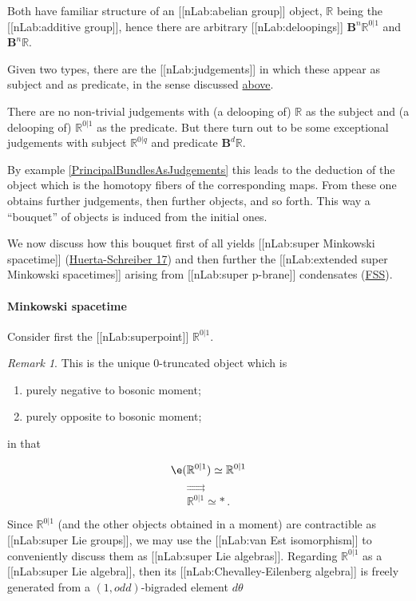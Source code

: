 \documentclass[12pt,titlepage]{article}
\theoremstyle{plain}
\theoremstyle{definition}
\theoremstyle{remark}
\newtheorem{remark}{Remark}
\begin{document}
Both have familiar structure of an [[nLab:abelian group]] object, $\mathbb{R}$ being the [[nLab:additive group]], hence there are arbitrary [[nLab:deloopings]] $\mathbf{B}^n \mathbb{R}^{0|1}$ and $\mathbf{B}^{n}\mathbb{R}$.

Given two types, there are the [[nLab:judgements]] in which these appear as subject and as predicate, in the sense discussed \hyperlink{JudgementInFormalization}{above}.

There are no non-trivial judgements with (a delooping of) $\mathbb{R}$ as the subject and (a delooping of) $\mathbb{R}^{0|1}$ as the predicate. But there turn out to be some exceptional judgements with subject $\mathbb{R}^{0|q}$ and predicate $\mathbf{B}^d \mathbb{R}$.

By example \ref{PrincipalBundlesAsJudgements} this leads to the deduction of the object which is the homotopy fibers of the corresponding maps. From these one obtains further judgements, then further objects, and so forth. This way a ``bouquet'' of objects is induced from the initial ones.

We now discuss how this bouquet first of all yields [[nLab:super Minkowski spacetime]] (\hyperlink{HuertaSchreiber17}{Huerta-Schreiber 17}) and then further the [[nLab:extended super Minkowski spacetimes]] arising from [[nLab:super p-brane]] condensates (\hyperlink{FSS}{FSS}).

\hypertarget{minkowski_spacetime}{}\paragraph*{{Minkowski spacetime}}\label{minkowski_spacetime}

Consider first the [[nLab:superpoint]] $\mathbb{R}^{0|1}$.

\begin{remark}
\label{}\hypertarget{}{}
This is the unique 0-truncated object which is

\begin{enumerate}%
\item purely negative to bosonic moment;


\item purely opposite to bosonic moment;



\end{enumerate}
in that

\begin{displaymath}
\e(\mathbb{R}^{0|1})\simeq \mathbb{R}^{0|1}
\end{displaymath}
\begin{displaymath}
\stackrel{\rightrightarrows}{\mathbb{R}^{0|1}} \simeq \ast
  \,.
\end{displaymath}
\end{remark}
Since $\mathbb{R}^{0|1}$ (and the other objects obtained in a moment) are contractible as [[nLab:super Lie groups]], we may use the [[nLab:van Est isomorphism]] to conveniently discuss them as [[nLab:super Lie algebras]]. Regarding $\mathbb{R}^{0\vert 1}$ as a [[nLab:super Lie algebra]], then its [[nLab:Chevalley-Eilenberg algebra]] is freely generated from a $(1,odd)$-bigraded element $d\theta$
\end{document}
